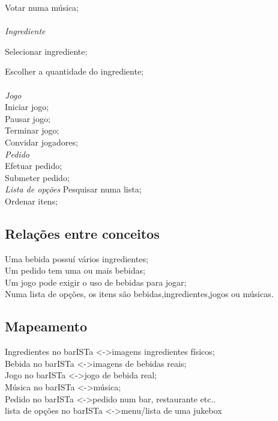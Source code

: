 \documentclass{article}
\begin{document}
 Votar numa música;\\\\
\textit{Ingrediente}

		Selecionar ingrediente;

		Escolher a quantidade do ingrediente;\\\\
\textit{Jogo}\\
		Iniciar jogo;\\
		Pausar jogo;\\
		Terminar jogo;\\
		Convidar jogadores;\\
\textit{Pedido}\\
		Efetuar pedido;\\
		Submeter pedido;\\
		
\textit{Lista de opções}
		Pesquisar numa lista;\\
		Ordenar itens;\\

\subsection*{Relações entre conceitos}
Uma bebida possuí vários ingredientes;\\
Um pedido tem uma ou mais bebidas;\\
Um jogo pode exigir o uso de bebidas para jogar;\\
Numa lista de opções, os itens são bebidas,ingredientes,jogos ou músicas.\\



\subsection*{Mapeamento}
Ingredientes no barISTa \textless -\textgreater imagens ingredientes físicos;\\
Bebida no barISTa \textless -\textgreater   imagens de bebidas reais;\\
Jogo no barISTa \textless -\textgreater  jogo de bebida real;\\
Música no barISTa \textless -\textgreater  música; \\
Pedido no barISTa \textless -\textgreater  pedido num bar, restaurante etc..\\
lista de opções no barISTa \textless -\textgreater menu/lista de uma jukebox \\
\end{document}
